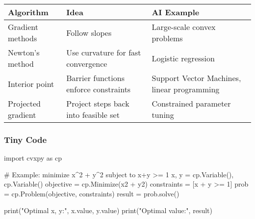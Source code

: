 \documentclass[
  letterpaper,
  DIV=11,
  numbers=noendperiod]{scrreprt}
\newenvironment{Shaded}{\begin{snugshade}}{\end{snugshade}}
\newcommand{\BuiltInTok}[1]{\textcolor[rgb]{0.00,0.23,0.31}{#1}}
\newcommand{\CommentTok}[1]{\textcolor[rgb]{0.37,0.37,0.37}{#1}}
\newcommand{\DecValTok}[1]{\textcolor[rgb]{0.68,0.00,0.00}{#1}}
\newcommand{\ImportTok}[1]{\textcolor[rgb]{0.00,0.46,0.62}{#1}}
\newcommand{\NormalTok}[1]{\textcolor[rgb]{0.00,0.23,0.31}{#1}}
\newcommand{\OperatorTok}[1]{\textcolor[rgb]{0.37,0.37,0.37}{#1}}
\newcommand{\StringTok}[1]{\textcolor[rgb]{0.13,0.47,0.30}{#1}}
\begin{document}
\begin{longtable}[]{@{}
  >{\raggedright\arraybackslash}p{}
  >{\raggedright\arraybackslash}p{}
  >{\raggedright\arraybackslash}p{}@{}}
\toprule\noalign{}
\begin{minipage}[b]{\linewidth}\raggedright
Algorithm
\end{minipage} & \begin{minipage}[b]{\linewidth}\raggedright
Idea
\end{minipage} & \begin{minipage}[b]{\linewidth}\raggedright
AI Example
\end{minipage} \\
\midrule\noalign{}
\endhead
\bottomrule\noalign{}
\endlastfoot
Gradient methods & Follow slopes & Large-scale convex problems \\
Newton's method & Use curvature for fast convergence & Logistic
regression \\
Interior point & Barrier functions enforce constraints & Support Vector
Machines, linear programming \\
Projected gradient & Project steps back into feasible set & Constrained
parameter tuning \\
\end{longtable}

\subsubsection{Tiny Code}\label{tiny-code-145}

\begin{Shaded}
\begin{Highlighting}[]
\ImportTok{import}\NormalTok{ cvxpy }\ImportTok{as}\NormalTok{ cp}

\CommentTok{\# Example: minimize x\^{}2 + y\^{}2 subject to x+y \textgreater{}= 1}
\NormalTok{x, y }\OperatorTok{=}\NormalTok{ cp.Variable(), cp.Variable()}
\NormalTok{objective }\OperatorTok{=}\NormalTok{ cp.Minimize(x2 }\OperatorTok{+}\NormalTok{ y2)}
\NormalTok{constraints }\OperatorTok{=}\NormalTok{ [x }\OperatorTok{+}\NormalTok{ y }\OperatorTok{\textgreater{}=} \DecValTok{1}\NormalTok{]}
\NormalTok{prob }\OperatorTok{=}\NormalTok{ cp.Problem(objective, constraints)}
\NormalTok{result }\OperatorTok{=}\NormalTok{ prob.solve()}

\BuiltInTok{print}\NormalTok{(}\StringTok{"Optimal x, y:"}\NormalTok{, x.value, y.value)}
\BuiltInTok{print}\NormalTok{(}\StringTok{"Optimal value:"}\NormalTok{, result)}
\end{Highlighting}
\end{Shaded}
\end{document}
